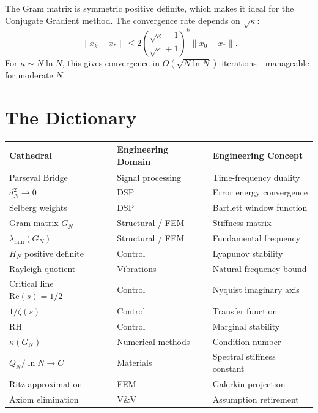 \documentclass[11pt,a4paper]{article}
\begin{document}
The Gram matrix is symmetric positive definite, which makes it
ideal for the Conjugate Gradient method. The convergence rate
depends on $\sqrt{\kappa}$:
\[
  \|x_k - x_*\| \leq 2 \left(\frac{\sqrt{\kappa} - 1}
  {\sqrt{\kappa} + 1}\right)^k \|x_0 - x_*\|.
\]
For $\kappa \sim N \ln N$, this gives convergence in
$O(\sqrt{N \ln N})$ iterations---manageable for moderate $N$.

\section{The Dictionary}
\label{sec:dictionary}

\begin{center}
\small
\begin{tabular}{@{}lll@{}}
\toprule
\textbf{Cathedral} & \textbf{Engineering Domain} & \textbf{Engineering Concept} \\
\midrule
Parseval Bridge & Signal processing & Time-frequency duality \\
$d_N^2 \to 0$ & DSP & Error energy convergence \\
Selberg weights & DSP & Bartlett window function \\
Gram matrix $G_N$ & Structural / FEM & Stiffness matrix \\
$\lambda_{\min}(G_N)$ & Structural / FEM & Fundamental frequency \\
$H_N$ positive definite & Control & Lyapunov stability \\
Rayleigh quotient & Vibrations & Natural frequency bound \\
Critical line $\mathrm{Re}(s)=1/2$ & Control & Nyquist imaginary axis \\
$1/\zeta(s)$ & Control & Transfer function \\
RH & Control & Marginal stability \\
$\kappa(G_N)$ & Numerical methods & Condition number \\
$Q_N / \ln N \to C$ & Materials & Spectral stiffness constant \\
Ritz approximation & FEM & Galerkin projection \\
Axiom elimination & V\&V & Assumption retirement \\
\bottomrule
\end{tabular}
\end{center}

\end{document}
